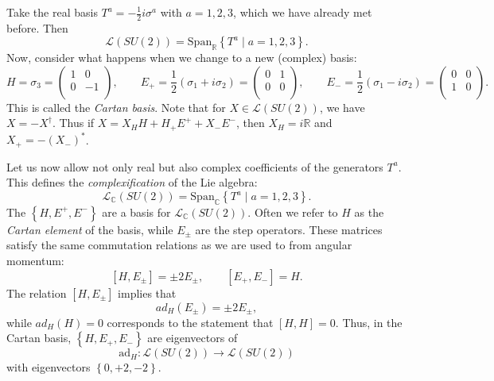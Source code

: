 Take the real basis $T^a = - \frac{1}{2} i \sigma^a$ with $a = 1,2,3$, which we have already met before.
Then
\begin{equation}
  \mathscr{L}(SU(2)) = \text{Span}_{\mathbb{R}} \left\{ T^a \mid a = 1,2,3 \right\}.
\end{equation}
Now, consider what happens when we change to a new (complex) basis:
\begin{equation}
  H = \sigma_3 =
  \begin{pmatrix}
   1 & 0 \\
   0 & -1 \\
  \end{pmatrix}, \qquad
  E_+ = \frac{1}{2} (\sigma_1 + i \sigma_2) = 
  \begin{pmatrix}
   0 & 1 \\
   0 & 0 \\
  \end{pmatrix}, \qquad
  E_- = \frac{1}{2} (\sigma_1 - i\sigma_2) =
  \begin{pmatrix}
   0 & 0 \\
   1 & 0 \\
  \end{pmatrix}.
\end{equation}
This is called the \emph{Cartan basis}.
Note that for $X \in \mathscr{L}(SU(2))$, we have $X = -X^{\dagger}$.
Thus if $X = X_H H + H_+ E^+ + X_- E^-$, then $X_H = i \mathbb{R}$ and $X_+ = -(X_-)^*$.

Let us now allow not only real but also complex coefficients of the generators $T^a$. This defines the \emph{complexification} of the Lie algebra:
\begin{equation}
  \mathscr{L}_{\mathbb{C}} (SU(2)) = \text{Span}_{\mathbb{C}} \left\{ T^a \mid a = 1,2,3 \right\}.
\end{equation}
The $\left\{ H, E^+, E^- \right\}$ are a basis for $\mathscr{L}_{\mathbb{C}}(SU(2))$.
Often we refer to $H$ as the \emph{Cartan element} of the basis, while $E_{\pm}$ are the step operators.
These matrices satisfy the same commutation relations as we are used to from angular momentum:
\begin{equation}
  \label{eq:L(su2)}
  [H, E_{\pm}] = \pm 2 E_{\pm}, \qquad [E_+, E_-] = H.
\end{equation}
The relation $[H, E_{\pm}]$ implies that 
\begin{equation}
  ad_{H}(E_{\pm}) = \pm 2 E_{\pm},
\end{equation}
while $ad_H(H) = 0$ corresponds to the statement that $[H, H] = 0$.
Thus, in the Cartan basis, $\left\{ H, E_+, E_- \right\}$ are eigenvectors of
\begin{equation}
  \text{ad}_H \colon \mathscr{L}(SU(2)) \to \mathscr{L}(SU(2))
\end{equation}
with eigenvectors $\left\{ 0, +2, -2 \right\}$. 


